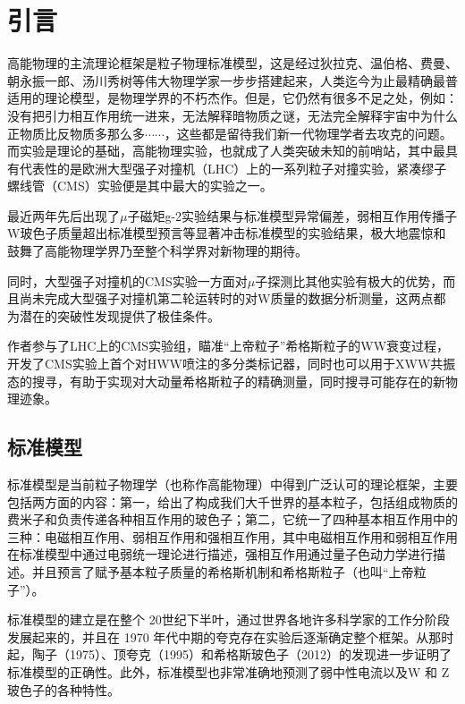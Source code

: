\chapter{引言}
\label{chap1}
\fontsize{12bp}{14.4pt}

高能物理的主流理论框架是粒子物理标准模型，这是经过狄拉克、温伯格、费曼、朝永振一郎、汤川秀树等伟大物理学家一步步搭建起来，人类迄今为止最精确最普适用的理论模型，是物理学界的不朽杰作。但是，它仍然有很多不足之处，例如：没有把引力相互作用统一进来，无法解释暗物质之谜，无法完全解释宇宙中为什么正物质比反物质多那么多$\cdots\cdots$，这些都是留待我们新一代物理学者去攻克的问题。而实验是理论的基础，高能物理实验，也就成了人类突破未知的前哨站，其中最具有代表性的是欧洲大型强子对撞机（LHC）上的一系列粒子对撞实验，紧凑缪子螺线管（CMS）实验便是其中最大的实验之一。

最近两年先后出现了$\mu$子磁矩g-2实验结果与标准模型异常偏差\cite{muong-2}，弱相互作用传播子W玻色子质量超出标准模型预言\cite{Wmass}等显著冲击标准模型的实验结果，极大地震惊和鼓舞了高能物理学界乃至整个科学界对新物理的期待。

同时，大型强子对撞机的CMS实验一方面对$\mu$子探测比其他实验有极大的优势，而且尚未完成大型强子对撞机第二轮运转时的对W质量的数据分析测量，这两点都为潜在的突破性发现提供了极佳条件。

作者参与了LHC上的CMS实验组，瞄准“上帝粒子”希格斯粒子的WW衰变过程，开发了CMS实验上首个对HWW喷注的多分类标记器，同时也可以用于XWW共振态的搜寻，有助于实现对大动量希格斯粒子的精确测量，同时搜寻可能存在的新物理迹象。

\section{标准模型}
标准模型是当前粒子物理学（也称作高能物理）中得到广泛认可的理论框架，主要包括两方面的内容：第一，给出了构成我们大千世界的基本粒子，包括组成物质的费米子和负责传递各种相互作用的玻色子；第二，它统一了四种基本相互作用中的三种：电磁相互作用、弱相互作用和强相互作用，其中电磁相互作用和弱相互作用在标准模型中通过电弱统一理论进行描述，强相互作用通过量子色动力学进行描述。并且预言了赋予基本粒子质量的希格斯机制和希格斯粒子（也叫“上帝粒子”）。

标准模型的建立是在整个 20世纪下半叶，通过世界各地许多科学家的工作分阶段发展起来的，并且在 1970 年代中期的夸克存在实验后逐渐确定整个框架。从那时起，陶子\cite{Discovery_of_Tauon}（1975）、顶夸克\cite{top_quark_discovery}（1995）和希格斯玻色子\cite{Higgs_discovery}（2012）的发现进一步证明了标准模型的正确性。此外，标准模型也非常准确地预测了弱中性电流以及W 和 Z 玻色子的各种特性。
